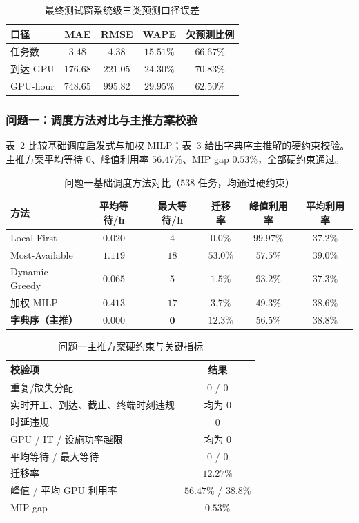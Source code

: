 \documentclass[UTF8,a4paper,zihao=-4]{ctexart}
\begin{document}
\begin{table}[H]
\centering
\small
\caption{最终测试窗系统级三类预测口径误差}
\label{tab:app-forecast-three}
\begin{tabular}{lcccc}
\toprule
口径 & MAE & RMSE & WAPE & 欠预测比例 \\
\midrule
任务数 & $3.48$ & $4.38$ & $15.51\%$ & $66.67\%$ \\
到达 GPU & $176.68$ & $221.05$ & $24.30\%$ & $70.83\%$ \\
GPU-hour & $748.65$ & $995.82$ & $29.95\%$ & $62.50\%$ \\
\bottomrule
\end{tabular}
\end{table}

\subsubsection{问题一：调度方法对比与主推方案校验}

表~\ref{tab:app-q1-methods} 比较基础调度启发式与加权 MILP；表~\ref{tab:app-q1-hard} 给出字典序主推解的硬约束校验。主推方案平均等待 $0$、峰值利用率 $56.47\%$、MIP gap $0.53\%$，全部硬约束通过。

\begin{table}[H]
\centering
\footnotesize
\caption{问题一基础调度方法对比（$538$ 任务，均通过硬约束）}
\label{tab:app-q1-methods}
\setlength{\tabcolsep}{3.5pt}
\begin{tabular}{lccccc}
\toprule
方法 & 平均等待/h & 最大等待/h & 迁移率 & 峰值利用率 & 平均利用率 \\
\midrule
Local-First & $0.020$ & $4$ & $0.0\%$ & $99.97\%$ & $37.2\%$ \\
Most-Available & $1.119$ & $18$ & $53.0\%$ & $57.5\%$ & $39.0\%$ \\
Dynamic-Greedy & $0.065$ & $5$ & $1.5\%$ & $93.2\%$ & $37.3\%$ \\
加权 MILP & $0.413$ & $17$ & $3.7\%$ & $49.3\%$ & $38.6\%$ \\
\textbf{字典序（主推）} & $\mathbf{0.000}$ & $\mathbf{0}$ & $12.3\%$ & $\mathbf{56.5\%}$ & $38.8\%$ \\
\bottomrule
\end{tabular}
\end{table}

\begin{table}[H]
\centering
\small
\caption{问题一主推方案硬约束与关键指标}
\label{tab:app-q1-hard}
\begin{tabular}{lc}
\toprule
校验项 & 结果 \\
\midrule
重复/缺失分配 & $0$ / $0$ \\
实时开工、到达、截止、终端时刻违规 & 均为 $0$ \\
时延违规 & $0$ \\
GPU / IT / 设施功率越限 & 均为 $0$ \\
平均等待 / 最大等待 & $0$ / $0$ \\
迁移率 & $12.27\%$ \\
峰值 / 平均 GPU 利用率 & $56.47\%$ / $38.8\%$ \\
MIP gap & $0.53\%$ \\
\bottomrule
\end{tabular}
\end{table}
\end{document}
